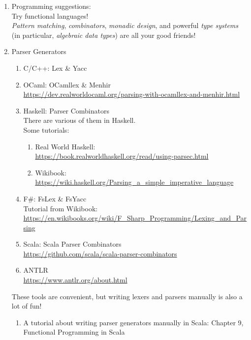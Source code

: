 \documentclass{article}
\begin{document}
\begin{enumerate}
    \item Programming suggestions:\\
    Try functional languages!\\
    \emph{Pattern matching}, \emph{combinators}, \emph{monadic design}, and powerful \emph{type systems} (in particular, \emph{algebraic data types}) are all your good friends!

    \item Parser Generators
    \begin{enumerate}
        \item C/C++: Lex \& Yacc \cite{levine1992lex}
        \item OCaml: OCamllex \& Menhir\\
        \href{https://dev.realworldocaml.org/parsing-with-ocamllex-and-menhir.html}{https://dev.realworldocaml.org/parsing-with-ocamllex-and-menhir.html}
        \item Haskell: Parser Combinators\\
        There are various of them in Haskell.\\
        Some tutorials:
        \begin{enumerate}
            \item Real World Haskell: \\
            \href{https://book.realworldhaskell.org/read/using-parsec.html}{https://book.realworldhaskell.org/read/using-parsec.html}
            \item Wikibook: \\
            \href{https://wiki.haskell.org/Parsing_a_simple_imperative_language}{https://wiki.haskell.org/Parsing\_a\_simple\_imperative\_language}
        \end{enumerate}
        \item F\#: FsLex \& FsYacc\\
        Tutorial from Wikibook:\\
        \href{https://en.wikibooks.org/wiki/F_Sharp_Programming/Lexing_and_Parsing}{https://en.wikibooks.org/wiki/F\_Sharp\_Programming/Lexing\_and\_Parsing}
        \item Scala: Scala Parser Combinators\\
        \href{https://github.com/scala/scala-parser-combinators}{https://github.com/scala/scala-parser-combinators}
        \item ANTLR\\
        \href{https://www.antlr.org/about.html}{https://www.antlr.org/about.html}
    \end{enumerate}
    These tools are convenient, but writing lexers and parsers manually is also a lot of fun!
    \begin{enumerate}
        \item A tutorial about writing parser generators manually in Scala:
        Chapter 9, Functional Programming in Scala
        \cite{chiusano2014functional}
    \end{enumerate}


\end{enumerate}
\end{document}
